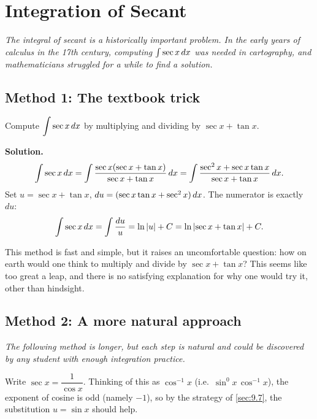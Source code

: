 \section{Integration of Secant}
\label{sec:9.9}

\textit{The integral of secant is a historically important problem.  In the early years of calculus in the 17th century, computing $\int \sec x\,dx$ was needed in cartography, and mathematicians struggled for a while to find a solution.}

\subsection*{Method 1: The textbook trick}

\begin{example}
\label{ex:9-16}
Compute $\displaystyle\int \sec x\,dx$ by multiplying and dividing by $\sec x + \tan x$.

\textbf{Solution.}
\[
  \int \sec x\,dx = \int \frac{\sec x(\sec x + \tan x)}{\sec x + \tan x}\,dx = \int \frac{\sec^{2}x + \sec x\tan x}{\sec x + \tan x}\,dx.
\]
Set $u = \sec x + \tan x$, $du = (\sec x\tan x + \sec^{2}x)\,dx$.  The numerator is exactly $du$:
\[
  \int \sec x\,dx = \int \frac{du}{u} = \ln\left\lvert u \right\rvert + C = \ln\left\lvert \sec x + \tan x \right\rvert + C.
\]
\end{example}

\begin{remark}
This method is fast and simple, but it raises an uncomfortable question: how on earth would one think to multiply and divide by $\sec x + \tan x$?  This seems like too great a leap, and there is no satisfying explanation for why one would try it, other than hindsight.
\end{remark}

\subsection*{Method 2: A more natural approach}

\textit{The following method is longer, but each step is natural and could be discovered by any student with enough integration practice.}

Write $\sec x = \dfrac{1}{\cos x}$.  Thinking of this as $\cos^{-1}x$ (i.e.\ $\sin^{0}x\,\cos^{-1}x$), the exponent of cosine is odd (namely $-1$), so by the strategy of \cref{sec:9.7}, the substitution $u = \sin x$ should help.

